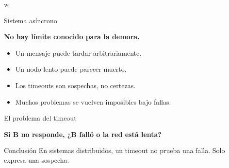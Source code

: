 w\documentclass[aspectratio=169]{beamer}
\begin{document}
\begin{frame}{Sistema asíncrono}

\Large

\begin{center}
\textbf{No hay límite conocido para la demora.}
\end{center}

\vspace{0.7cm}

\normalsize

\begin{itemize}
    \item Un mensaje puede tardar arbitrariamente.
    \item Un nodo lento puede parecer muerto.
    \item Los timeouts son sospechas, no certezas.
    \item Muchos problemas se vuelven imposibles bajo fallas.
\end{itemize}

\end{frame}

\begin{frame}{El problema del timeout}

\Large

\begin{center}
\textbf{Si B no responde, ¿B falló o la red está lenta?}
\end{center}

\vspace{0.6cm}

\begin{center}
\end{center}

\vspace{0.5cm}

\normalsize

\begin{block}{Conclusión}
En sistemas distribuidos, un timeout no prueba una falla. Solo expresa una sospecha.
\end{block}

\end{frame}
\end{document}
